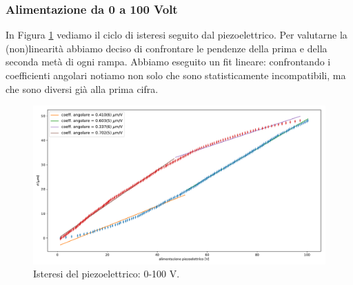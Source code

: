 \documentclass[a4paper]{article}
\begin{document}
\subsubsection{Alimentazione da 0 a 100 Volt}
In Figura \ref{fig:0-100} vediamo il ciclo di isteresi seguito dal piezoelettrico. Per valutarne la (non)linearità abbiamo deciso di confrontare le pendenze della prima e della seconda metà di ogni rampa. Abbiamo eseguito un fit lineare: confrontando i coefficienti angolari notiamo non solo che sono statisticamente incompatibili, ma che sono diversi già alla prima cifra.
\begin{figure}[H]
	\includegraphics[width=1\textwidth]{isteresi_0-100.pdf}
	\caption{Isteresi del piezoelettrico: 0-100 V.}
	\label{fig:0-100}
\end{figure}
\end{document}
